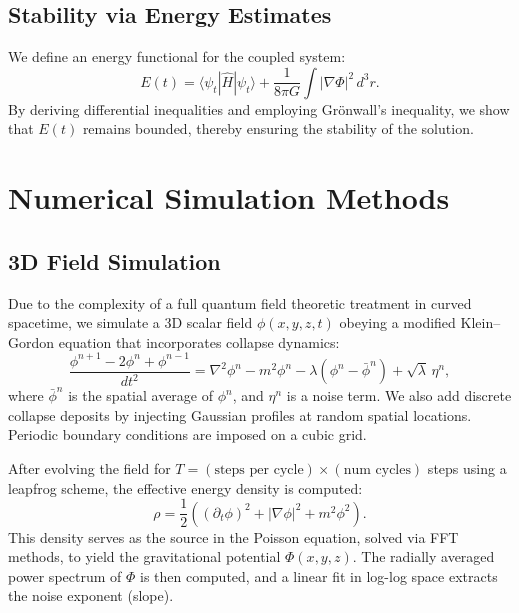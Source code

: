 \documentclass[11pt,a4paper]{article}
\begin{document}
\subsection{Stability via Energy Estimates}
We define an energy functional for the coupled system:
\[
E(t) = \langle \psi_t |\hat{H}|\psi_t \rangle + \frac{1}{8\pi G}\int |\nabla \Phi|^2\,d^3r.
\]
By deriving differential inequalities and employing Grönwall's inequality, we show that $E(t)$ remains bounded, thereby ensuring the stability of the solution.

\section{Numerical Simulation Methods}
\subsection{3D Field Simulation}
Due to the complexity of a full quantum field theoretic treatment in curved spacetime, we simulate a 3D scalar field $\phi(x,y,z,t)$ obeying a modified Klein--Gordon equation that incorporates collapse dynamics:
\begin{equation} \label{eq:KG}
\frac{\phi^{n+1} - 2\phi^n + \phi^{n-1}}{dt^2} = \nabla^2\phi^n - m^2 \phi^n - \lambda\left(\phi^n - \bar{\phi}^n\right) + \sqrt{\lambda}\,\eta^n,
\end{equation}
where $\bar{\phi}^n$ is the spatial average of $\phi^n$, and $\eta^n$ is a noise term. We also add discrete collapse deposits by injecting Gaussian profiles at random spatial locations. Periodic boundary conditions are imposed on a cubic grid.

After evolving the field for $T = (\text{steps per cycle}) \times (\text{num cycles})$ steps using a leapfrog scheme, the effective energy density is computed:
\[
\rho = \frac{1}{2}\left((\partial_t \phi)^2 + |\nabla \phi|^2 + m^2 \phi^2\right).
\]
This density serves as the source in the Poisson equation, solved via FFT methods, to yield the gravitational potential $\Phi(x,y,z)$. The radially averaged power spectrum of $\Phi$ is then computed, and a linear fit in log-log space extracts the noise exponent (slope).
\end{document}
